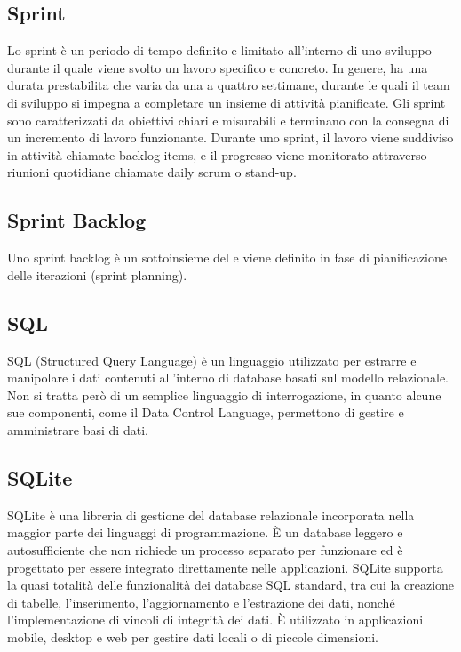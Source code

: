 \vspace{2em}
\subsection*{Sprint}
\par Lo sprint è un periodo di tempo definito e limitato all'interno di uno sviluppo  durante il quale viene svolto un lavoro specifico e concreto. In genere, ha una durata prestabilita che varia da una a quattro settimane, durante le quali il team di sviluppo si impegna a completare un insieme di attività pianificate. Gli sprint sono caratterizzati da obiettivi chiari e misurabili e terminano con la consegna di un incremento di lavoro funzionante. Durante uno sprint, il lavoro viene suddiviso in attività chiamate backlog items, e il progresso viene monitorato attraverso riunioni quotidiane chiamate daily scrum o stand-up.

\vspace{2em}
\subsection*{Sprint Backlog}
\par Uno sprint backlog è un sottoinsieme del  e viene definito in fase di pianificazione delle iterazioni (sprint planning).

\vspace{2em}
\subsection*{SQL}
\par SQL (Structured Query Language) è un linguaggio utilizzato per estrarre e manipolare i dati contenuti all'interno di database basati sul modello relazionale. Non si tratta però di un semplice linguaggio di interrogazione, in quanto alcune sue componenti, come il Data Control Language, permettono di gestire e amministrare basi di dati.

\vspace{2em}
\subsection*{SQLite}
\par SQLite è una libreria di gestione del database relazionale incorporata nella maggior parte dei linguaggi di programmazione. È un database leggero e autosufficiente che non richiede un processo separato per funzionare ed è progettato per essere integrato direttamente nelle applicazioni. SQLite supporta la quasi totalità delle funzionalità dei database SQL standard, tra cui la creazione di tabelle, l'inserimento, l'aggiornamento e l'estrazione dei dati, nonché l'implementazione di vincoli di integrità dei dati. È utilizzato in applicazioni mobile, desktop e web per gestire dati locali o di piccole dimensioni.

